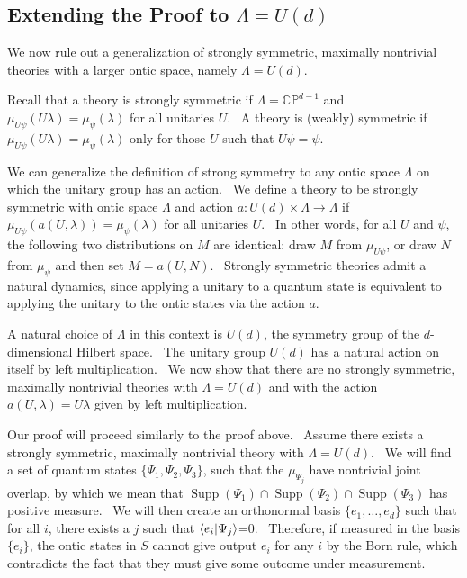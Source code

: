 \documentclass[letterpaper,11pt]{article}
\newcommand{\braket}[2]{\mbox{$ \langle #1 | #2 \rangle $}}
\DeclareMathOperator{\supp}{Supp}
\begin{document}
\subsection{Extending the Proof to $\Lambda=U(d)$}


We now rule out a generalization of strongly symmetric, maximally nontrivial theories with a larger ontic space, namely $\Lambda=U(d)$.

Recall that a theory is strongly symmetric if $\Lambda=\mathbb{CP}^{d-1}$ and $\mu_{U\psi}(U\lambda)=\mu_{\psi}(\lambda)$ for all unitaries $U$. \ A theory is (weakly) symmetric if $\mu_{U\psi}(U\lambda)=\mu_{\psi}(\lambda)$ only for those $U$ such that $U\psi=\psi$.


We can generalize the definition of strong symmetry to any ontic space $\Lambda$ on which the unitary group has an action. \ We define a theory to be strongly symmetric with ontic space $\Lambda$ and action $a: U(d) \times \Lambda \rightarrow \Lambda$ if $\mu_{U\psi}(a(U,\lambda))=\mu_{\psi}(\lambda)$ for all unitaries $U$. \ In other words, for all $U$ and $\psi$, the following two distributions on $M$ are identical: draw $M$ from $\mu_{U\psi}$, or draw $N$ from $\mu_\psi$ and then set $M=a(U,N)$. \ Strongly symmetric theories admit a natural dynamics, since applying a unitary to a quantum state is equivalent to applying the unitary to the ontic states via the action $a$.

A natural choice of $\Lambda$ in this context is $U(d)$, the symmetry group of the $d$-dimensional Hilbert space. \ The unitary group $U(d)$ has a natural action on itself by left multiplication. \ We now show that there are no strongly symmetric, maximally nontrivial theories with $\Lambda=U(d)$ and with the action $a(U, \lambda)=U\lambda$ given by left multiplication.


Our proof will proceed similarly to the proof above. \ Assume there exists a strongly symmetric, maximally nontrivial theory with $\Lambda=U(d)$. \ We will find a set of quantum states $\{\Psi_1,\Psi_2,\Psi_3\}$, such that the $\mu_{\Psi_j}$ have nontrivial joint overlap, by which we mean that $\supp(\Psi_1)\cap \supp(\Psi_2) \cap \supp(\Psi_3) $ has positive measure. \ We will then create an orthonormal basis $\{e_1,\ldots,e_d\}$ such that for all $i$, there exists a $j$ such that $\braket{e_i}{\Psi_j}$=0. \ Therefore, if measured in the basis $\{e_i\}$, the ontic states in $S$ cannot give output $e_i$ for any $i$ by the Born rule, which contradicts the fact that they must give some outcome under measurement.
\end{document}
